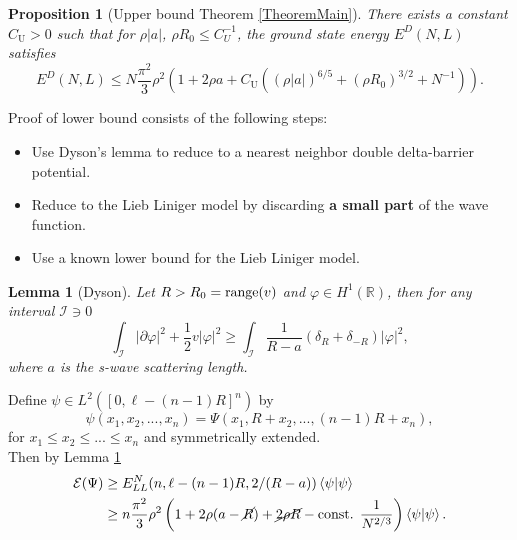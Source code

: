 \documentclass[final]{beamer}
\newcommand{\abs}[1]{\left\lvert #1 \right\rvert}
\renewcommand{\braket}[1]{\left\langle#1\right\rangle}
\newcommand{\R}{\mathbb{R}}
\newtheorem{mproposition}{Proposition}
\newtheorem{mlemma}{Lemma}
\newlength{\colwidth}
\begin{document}
\begin{frame}[t]
\begin{columns}[t]
\begin{column}{\colwidth}
\begin{tcolorbox}[colframe=qmathblue,colback=qmathbluelyslyslys,title=Upper bound proof sketch]
			\begin{mproposition}[Upper bound Theorem \ref{TheoremMain}]
				\label{PropositionUpperBound}
				There exists a constant $C_\text{U}>0$ such that for $\rho|a|$, $\rho R_0\leq C_U^{-1}$, the ground state energy $E^D(N,L)$ satisfies
				\small{\begin{equation}
					\label{equpper}
					E^D(N,L)\leq N\frac{\pi^2}{3}\rho^2\left(1+2\rho a + C_\text{U}\left((\rho\abs{a})^{6/5}+(\rho R_0)^{3/2}+N^{-1}\right)\right).
					\end{equation}}
			\end{mproposition}
		\end{tcolorbox}\vspace{0.75cm}
		
	\begin{tcolorbox}[colframe=qmathblue,colback=qmathbluelyslyslys,title=Lower bound proof sketch]
		Proof of lower bound consists of the following steps:
		\begin{itemize}
			\item Use Dyson's lemma to reduce to a nearest neighbor double delta-barrier potential.
			\item Reduce to the Lieb Liniger model by discarding \textbf{a small part} of the wave function.
			\item Use a known lower bound for the Lieb Liniger model.
		\end{itemize}	
		\begin{mlemma}[Dyson]\label{LemmaDyson} Let $ R>R_0=\textnormal{range}(v) $ and $ \varphi\in H^1(\R) $, then for any interval $ \mathcal{I}\ni 0 $ 
			\begin{equation}
			\int_{\mathcal{I}} \abs{\partial \varphi}^2+\frac12 v\abs{\varphi}^2\geq \int_{\mathcal{I}}\frac{1}{R-a}\left(\delta_R+\delta_{-R}\right)\abs{\varphi}^2,
			\end{equation}
			where $ a $ is the s-wave scattering length.
		\end{mlemma}
		Define $ \psi\in L^2([0,\ell-(n-1)R]^n) $ by 
				$$ \psi(x_1,x_2,...,x_n)=\Psi(x_1,R+x_2,...,(n-1)R+x_n), $$
				for $ x_1\leq x_2\leq...\leq x_n $ and symmetrically extended.\\\vspace{0.2cm}
				Then by Lemma \ref{LemmaDyson} \begin{equation}
				\begin{aligned}
				\mathcal{E}(\Psi)&\geq E^N_{LL}(n,\ell-(n-1)R,2/(R-a))\braket{\psi|\psi}\\
				&\geq n\frac{\pi^2}{3}\rho^2\left(1+2\rho(a-\cancel{R})+\cancel{2\rho R}-\text{const. }\frac{1}{N^{2/3}}\right)\braket{\psi|\psi}.

\end{aligned}
\end{equation}
\end{tcolorbox}
\end{column}
\end{columns}
\end{frame}
\end{document}

